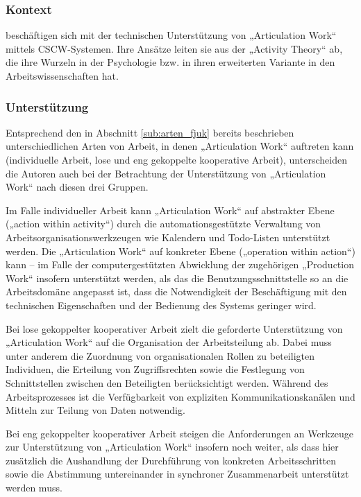 \subsubsection{Kontext}

\citet{Fjuk97} beschäftigen sich mit der technischen Unterstützung von „Articulation Work“ mittels \gls{CSCW}-Systemen. Ihre Ansätze leiten sie aus der „Activity Theory“ ab, die ihre Wurzeln in der Psychologie \citep{Leontev72} bzw. in ihren erweiterten Variante in den Arbeitswissenschaften \citep{Engestrom00} hat.
 
\subsubsection{Unterstützung}

Entsprechend den in Abschnitt \ref{sub:arten_fjuk} bereits beschrieben unterschiedlichen Arten von Arbeit, in denen „Articulation Work“ auftreten kann (individuelle Arbeit, lose und eng gekoppelte kooperative Arbeit), unterscheiden die Autoren auch bei der Betrachtung der Unterstützung von „Articulation Work“ nach diesen drei Gruppen.

Im Falle individueller Arbeit kann „Articulation Work“ auf abstrakter Ebene („action within activity“) durch die automationsgestützte Verwaltung von Arbeitsorganisationswerkzeugen wie Kalendern und Todo-Listen unterstützt werden. Die „Articulation Work“ auf konkreter Ebene („operation within action“) kann -- im Falle der computergestützten Abwicklung der zugehörigen „Production Work“ insofern unterstützt werden, als das die Benutzungsschnittstelle so an die Arbeitsdomäne angepasst ist, dass die Notwendigkeit der Beschäftigung mit den technischen Eigenschaften und der Bedienung des Systems geringer wird.

Bei lose gekoppelter kooperativer Arbeit zielt die geforderte Unterstützung von „Articulation Work“ auf die Organisation der Arbeitsteilung ab. Dabei muss unter anderem die Zuordnung von organisationalen Rollen zu beteiligten Individuen, die Erteilung von Zugriffsrechten sowie die Festlegung von Schnittstellen zwischen den Beteiligten berücksichtigt werden. Während des Arbeitsprozesses ist die Verfügbarkeit von expliziten Kommunikationskanälen und Mitteln zur Teilung von Daten notwendig.

Bei eng gekoppelter kooperativer Arbeit steigen die Anforderungen an Werkzeuge zur Unterstützung von „Articulation Work“ insofern noch weiter, als dass hier zusätzlich die Aushandlung der Durchführung von konkreten Arbeitsschritten sowie die Abstimmung untereinander in synchroner Zusammenarbeit unterstützt werden muss.

